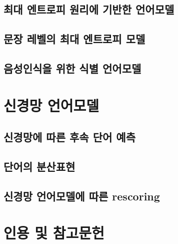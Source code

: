 \documentclass[../main.tex]{subfiles}
\begin{document}
\subsection{최대 엔트로피 원리에 기반한 언어모델}
\subsection{문장 레벨의 최대 엔트로피 모델}
\subsection{음성인식을 위한 식별 언어모델}

\section{신경망 언어모델}
\subsection{신경망에 따른 후속 단어 예측}
\subsection{단어의 분산표현}
\subsection{신경망 언어모델에 따른 rescoring}

\section*{인용 및 참고문헌}
\end{document}
